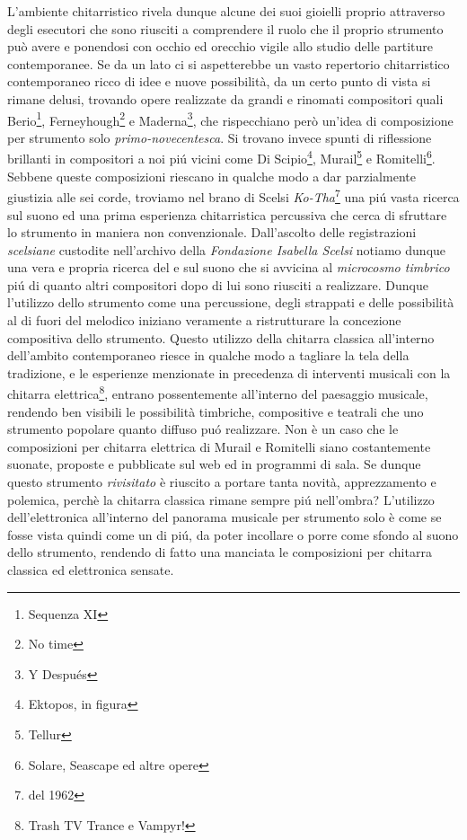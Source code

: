 \documentclass[oneside]{article}
\begin{document}
\begin{multicols*}{2}
L'ambiente chitarristico rivela dunque alcune dei suoi gioielli proprio attraverso degli esecutori che sono riusciti a comprendere il ruolo che il proprio strumento può avere e ponendosi con occhio ed orecchio vigile allo studio delle partiture contemporanee. Se da un lato ci si aspetterebbe un vasto repertorio chitarristico contemporaneo ricco di idee e nuove possibilità, da un certo punto di vista si rimane delusi, trovando opere realizzate da grandi e rinomati compositori quali Berio\footnote{Sequenza XI}, Ferneyhough\footnote{No time} e Maderna\footnote{Y Después}, che rispecchiano però un'idea di composizione per strumento solo \textit{primo-novecentesca}. Si trovano invece spunti di riflessione brillanti in compositori a noi piú vicini come Di Scipio\footnote{Ektopos, in figura}, Murail\footnote{Tellur} e Romitelli\footnote{Solare, Seascape ed altre opere}. Sebbene queste composizioni riescano in qualche modo a dar parzialmente giustizia alle sei corde, troviamo nel brano di Scelsi \textit{Ko-Tha}\footnote{del 1962} una piú vasta ricerca sul suono ed una prima esperienza chitarristica percussiva che cerca di sfruttare lo strumento in maniera non convenzionale. Dall'ascolto delle registrazioni \textit{scelsiane} custodite nell'archivo della \textit{Fondazione Isabella Scelsi} notiamo dunque una vera e propria ricerca del e sul suono che si avvicina al \textit{microcosmo timbrico} piú di quanto altri compositori dopo di lui sono riusciti a realizzare. Dunque l'utilizzo dello strumento come una percussione, degli strappati e delle possibilità al di fuori del melodico iniziano veramente a ristrutturare la concezione compositiva dello strumento. %
Questo utilizzo della chitarra classica all'interno dell'ambito contemporaneo riesce in qualche modo a tagliare la tela della tradizione, e le esperienze menzionate in precedenza di interventi musicali con la chitarra elettrica\footnote{Trash TV Trance e Vampyr!}, entrano possentemente all'interno del paesaggio musicale, rendendo ben visibili le possibilità timbriche, compositive e teatrali che uno strumento popolare quanto diffuso puó realizzare. Non è un caso che le composizioni per chitarra elettrica di Murail e Romitelli siano costantemente suonate, proposte e pubblicate sul web ed in programmi di sala. 
Se dunque questo strumento \textit{rivisitato} è riuscito a portare tanta novità, apprezzamento e polemica, perchè la chitarra classica rimane sempre piú nell'ombra?
L'utilizzo dell'elettronica all'interno del panorama musicale per strumento solo è come se fosse vista quindi come un di piú, da poter incollare o porre come sfondo al suono dello strumento, rendendo di fatto una manciata le composizioni per chitarra classica ed elettronica sensate.


\end{multicols*}
\end{document}
